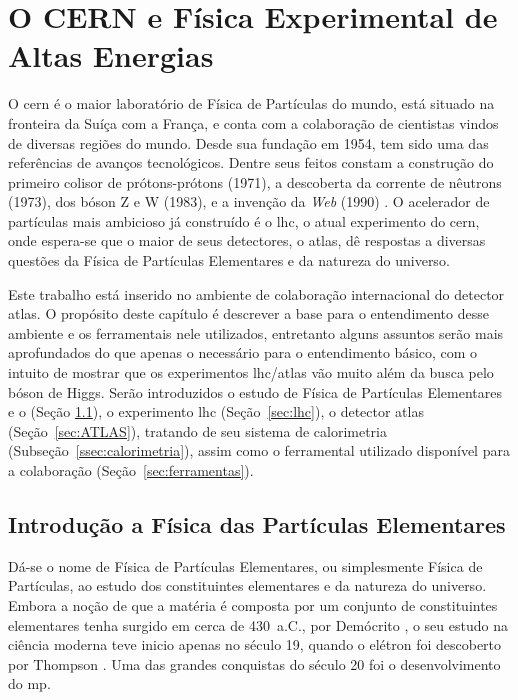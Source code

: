 \chapter{O CERN e Física Experimental de Altas Energias}
\label{cap:cern}
\glsresetall


O \gls{cern} é o maior laboratório de Física de Partículas do mundo, 
está situado na fronteira da Suíça com
a França, e conta com a colaboração de cientistas vindos 
de diversas regiões do mundo. Desde sua fundação em 1954, tem sido uma das referências de
avanços tecnológicos. Dentre seus feitos constam a construção do primeiro 
colisor de prótons-prótons (1971), a descoberta 
da corrente de nêutrons (1973), dos bóson Z e W (1983), 
e a invenção da \emph{Web} (1990) \cite{webCERN}. O acelerador de partículas mais ambicioso 
\cite{Intro_Standard,Beiser} já construído é o \gls{lhc}, o atual experimento do
\gls{cern}, onde espera-se que o maior de seus 
detectores, o \gls{atlas}, dê respostas a diversas questões da Física de Partículas
Elementares e da natureza do universo.

Este trabalho está inserido no ambiente de colaboração internacional do detector
\gls{atlas}. O propósito deste capítulo é descrever a base para o entendimento desse ambiente
e os ferramentais nele utilizados, entretanto alguns assuntos serão mais
aprofundados do que apenas o necessário para o entendimento básico, com o
intuito de mostrar que os experimentos \gls{lhc}/\gls{atlas} vão muito além 
da busca pelo bóson de Higgs. Serão introduzidos o estudo de Física de Partículas
Elementares e o  (Seção \ref{sec:fis_part}), 
o experimento \gls{lhc} (Seção~\ref{sec:lhc}), o detector
\gls{atlas} (Seção~\ref{sec:ATLAS}), tratando de seu sistema de calorimetria
(Subseção~\ref{ssec:calorimetria}), assim como o ferramental utilizado
disponível para a colaboração (Seção~\ref{sec:ferramentas}). 

\section{Introdução a Física das Partículas Elementares}
\label{sec:fis_part}

Dá-se o nome de Física de Partículas Elementares, ou simplesmente Física de
Partículas, ao estudo dos constituintes
elementares e da natureza do universo. Embora a noção de que a matéria é
composta por um conjunto de constituintes elementares tenha surgido em cerca de
430~a.C., por Demócrito \cite{democritos}, o seu estudo na ciência moderna teve inicio apenas 
no século 19, quando o elétron foi descoberto por Thompson \cite{thompson}.
Uma das grandes conquistas do século 20 foi o desenvolvimento do \gls{mp}.  


